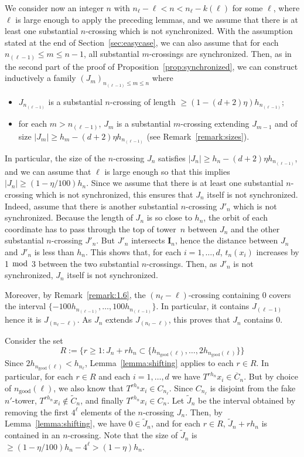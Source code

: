\documentclass[AHL,Unicode,longabstracts]{cedram}
\newcommand{\egdef}{:=}
\newcommand{\ngood}{n_{\text{good}}}
\newcommand{\ci}{\boldsymbol I}
\begin{document}
We consider now an integer $n$ with $n_\ell-\ell<n<n_\ell-k(\ell)$ for some $\ell$, where $\ell$ is large enough to apply the preceding lemmas, and we assume that there is at least one substantial $n$-crossing which is not synchronized. With the assumption stated at the end of Section~\ref{sec:easycase}, we can also assume that for each $n_{(\ell-1)}\le m\le n-1$, all substantial $m$-crossings are synchronized. Then, as in the second part of the proof of Proposition~\ref{prop:synchronized}, we can construct inductively a family $(J_m)_{n_{(\ell-1)}\le m\le n}$ where
\begin{itemize}
\item $J_{n_{(\ell-1)}}$ is a substantial $n$-crossing of length $\ge (1-(d+2)\eta)h_{n_{(\ell-1)}}$;
\item for each $m>n_{(\ell-1)}$, $J_m$ is a substantial $m$-crossing extending $J_{m-1}$ and of size $|J_m|\ge h_m-(d+2)\eta h_{n_{(\ell-1)}}$ (see Remark~\ref{remark:sizes}).
\end{itemize}
In particular, the size of the $n$-crossing $J_n$ satisfies $|J_n|\ge h_n-(d+2)\eta h_{n_{(\ell-1)}}$, and we can assume that $\ell$ is large enough so that this implies $|J_n|\ge (1-\eta/100)h_n$. Since we assume that there is at least one substantial $n$-crossing which is not synchronized, this ensures that $J_n$ itself is not synchronized. Indeed, assume that there is another substantial $n$-crossing $J'_n$ which is not synchronized. Because the length of $J_n$ is so close to $h_n$, the orbit of each coordinate has to pass through the top of tower~$n$ between $J_n$ and the other substantial $n$-crossing $J'_n$. But $J'_n$ intersects $\ci_n$, hence the distance between $J_n$ and $J'_n$ is less than $h_n$. This shows that, for each $i=1,\ldots,d$, $t_n(x_i)$ increases by 1 $\bmod$ 3 between the two substantial $n$-crossings. Then, as $J'_n$ is not synchronized, $J_n$ itself is not synchronized.


Moreover, by Remark~\ref{remark:1.6}, the $(n_\ell-\ell)$-crossing containing 0 covers the interval $\{-100 h_{n_{(\ell-1)}},\ldots, 100 h_{n_{(\ell-1)}}\}$. In particular, it contains $J_{(\ell-1)}$ hence it is $J_{(n_\ell-\ell)}$. As $J_n$ extends $J_{(n_\ell-\ell)}$, this proves that $J_n$ contains 0.

Consider the set
\[
R\egdef \bigl\{r\ge1: J_n+rh_n\subset\{h_{\ngood(\ell)},\ldots,2h_{\ngood(\ell)}\} \bigr\}
\]
Since $2h_{\ngood(\ell)}<h_{n_\ell}$, Lemma~\ref{lemma:shifting} applies to each $r\in R$. In particular, for each $r\in R$ and each $i=1,\ldots,d$ we have $T^{rh_n}x_i\in\overline{C}_n$. But by choice of $\ngood(\ell)$, we also know that $T^{rh_n}x_i\in C_{n_\ell}$. Since $C_{n_\ell}$ is disjoint from the fake $n'$-tower, $T^{rh_n}x_i\notin \tilde C_n$, and finally $T^{rh_n}x_i\in C_n$. Let $\tilde J_n$ be the interval obtained by removing the first $4^\ell$ elements of the $n$-crossing $J_n$. Then, by Lemma~\ref{lemma:shifting}, we have $0\in\tilde J_n$, and for each $r\in R$, $\tilde J_n+rh_n$ is contained in an $n$-crossing. Note that the size of $\tilde J_n$ is $\ge (1-\eta/100)h_n-4^\ell>(1-\eta) h_n$.
\end{document}
